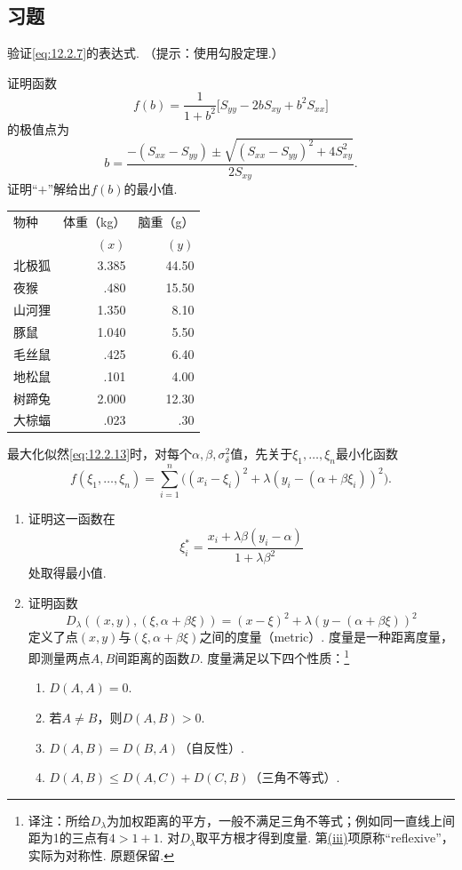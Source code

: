 \subsection{习题}\label{sec:12.5}
\begin{exercise}\label{exercise:12.1}
验证\eqref{eq:12.2.7}的表达式. （提示：使用勾股定理.）
\end{exercise}

\begin{exercise}\label{exercise:12.2}
证明函数
$$f(b)=\frac1{1+b^2}\bigl[S_{yy}-2bS_{xy}+b^2S_{xx}\bigr]$$
的极值点为
$$b=\frac{-(S_{xx}-S_{yy})\pm\sqrt{(S_{xx}-S_{yy})^2+4S_{xy}^2}}{2S_{xy}}.$$
证明“$+$”解给出$f(b)$的最小值.
\end{exercise}

\begin{center}\begin{tabular}{lrr}\toprule
物种&体重（kg）&脑重（g）\\&$(x)$&$(y)$\\\midrule
北极狐&3.385&44.50\\夜猴&.480&15.50\\山河狸&1.350&8.10\\豚鼠&1.040&5.50\\
毛丝鼠&.425&6.40\\地松鼠&.101&4.00\\树蹄兔&2.000&12.30\\大棕蝠&.023&.30\\\bottomrule
\end{tabular}\end{center}

\begin{exercise}\label{exercise:12.3}
最大化似然\eqref{eq:12.2.13}时，对每个$\alpha,\beta,\sigma_\delta^2$值，先关于$\xi_1,\ldots,\xi_n$最小化函数
$$f(\xi_1,\ldots,\xi_n)=\sum_{i=1}^n\bigl((x_i-\xi_i)^2+\lambda(y_i-(\alpha+\beta\xi_i))^2\bigr).$$
\begin{enumerate}[label=(\alph*)]
\item\label{item:12.3.a} 证明这一函数在
$$\xi_i^*=\frac{x_i+\lambda\beta(y_i-\alpha)}{1+\lambda\beta^2}$$
处取得最小值.
\item\label{item:12.3.b} 证明函数
$$D_\lambda((x,y),(\xi,\alpha+\beta\xi))=(x-\xi)^2+\lambda(y-(\alpha+\beta\xi))^2$$
定义了点$(x,y)$与$(\xi,\alpha+\beta\xi)$之间的度量（metric）. 度量是一种距离度量，即测量两点$A,B$间距离的函数$D$. 度量满足以下四个性质：\footnote{译注：所给$D_\lambda$为加权距离的平方，一般不满足三角不等式；例如同一直线上间距为1的三点有$4>1+1$. 对$D_\lambda$取平方根才得到度量. 第\hyperref[item:12.3.b.iii]{(iii)}项原称“reflexive”，实际为对称性. 原题保留.}
\begin{enumerate}[label=\roman*.]
\item $D(A,A)=0$.
\item 若$A\ne B$，则$D(A,B)>0$.
\item{}\label{item:12.3.b.iii} $D(A,B)=D(B,A)$（自反性）.
\item $D(A,B)\le D(A,C)+D(C,B)$（三角不等式）.
\end{enumerate}
\end{enumerate}
\end{exercise}


